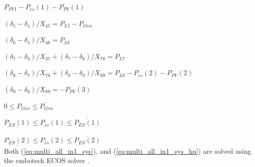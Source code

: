 $P_{PV1} - P_{es}(1) - P_{PV}(1)$

$(\delta_5 - \delta_4)/X_{45} = P_{L5}-P_{Gen}$

$(\delta_6 - \delta_4)/X_{46} = P_{L6}$

$(\delta_7 - \delta_3)/X_{37} + (\delta_7 - \delta_8)/X_{78}  = P_{L7}$

$(\delta_8 - \delta_7)/X_{78} + (\delta_8 - \delta_9)/X_{89}  = P_{L8} - P_{es}(2) - P_{PV}(2)$

$(\delta_9 - \delta_8)/X_{89} = -P_{PV}(3)$

$0 \leq P_{Gen} \leq \overline{P_{Gen}}$

$\underline{P_{ES}(1)} \leq P_{es}(1) \leq \overline{P_{ES}(1)}$

$\underline{P_{ES}(2)} \leq P_{es}(2) \leq \overline{P_{ES}(2)}$\\


Both (\ref{eq:multi_all_in1_sys}), and (\ref{eq:multi_all_in1_sys_hu}) are solved using the embotech ECOS solver \cite{ecos}. 